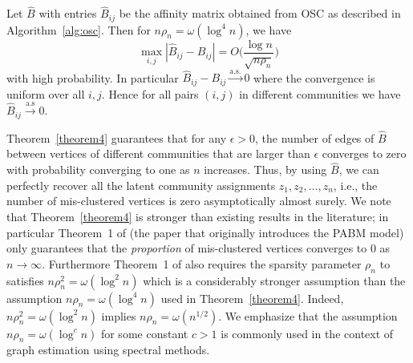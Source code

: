 \documentclass[12pt]{article}
\begin{document}
\begin{theorem}
\label{theorem4}
Let $\hat{B}$ with entries $\hat{B}_{ij}$ be the affinity matrix
obtained from OSC as described in Algorithm~\ref{alg:osc}. Then for $n \rho_n = \omega(\log^{4}{n})$, we have
\begin{equation} \label{eq:thm4a}
\max_{i, j} |\hat{B}_{ij} - B_{ij}| = O\Big( \frac{\log n}{\sqrt{n \rho_n}} \Big)
\end{equation}
with high probability. In particular $\hat{B}_{ij} -
B_{ij} \overset{\mathrm{a.s.}}{\rightarrow} 0$ where the convergence is
uniform over all $i,j$. Hence for all pairs $(i,j)$ in different
communities we have
$\hat{B}_{ij} \overset{\mathrm{a.s}}{\rightarrow} 0$. 
\end{theorem}
Theorem~\ref{theorem4} guarantees that for any $\epsilon > 0$, 
the number of edges of $\hat{B}$ between vertices of different communities 
that are larger than $\epsilon$ converges to zero with probability
converging to one as $n$ increases. Thus, by using $\hat{B}$, we can 
perfectly recover all the latent community assignments $z_1, z_2,
\dots, z_n$, i.e., the number of mis-clustered vertices is zero
asymptotically almost surely. We note that Theorem~\ref{theorem4} is
stronger than existing results in the literature; in particular
Theorem~1 of \citet{307cbeb9b1be48299388437423d94bf1} (the paper that
originally introduces the PABM model) only guarantees that the {\em
  proportion} of mis-clustered vertices converges to $0$ as $n
\rightarrow \infty$. Furthermore Theorem~1
of \citet{307cbeb9b1be48299388437423d94bf1} also requires the sparsity
parameter $\rho_n$ to satisfies $n \rho_n^2 = \omega(\log^2{n})$ which
is a considerably stronger assumption than the assumption $n \rho_n =
\omega(\log^{4}{n})$ used in Theorem~\ref{theorem4}. Indeed, $n
\rho_n^2 = \omega(\log^{2}{n})$ implies $n \rho_n = \omega(n^{1/2})$. 
We emphasize that the assumption $n \rho_n = \omega(\log^{c}{n})$ for
some constant $c > 1$ is commonly used in the context of graph
estimation using spectral methods.
\end{document}
